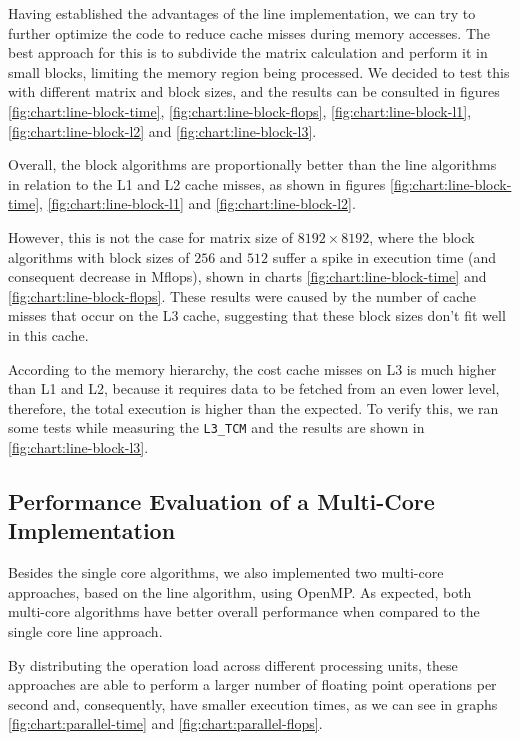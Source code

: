 Having established the advantages of the line implementation, we can try to further optimize the code to reduce cache misses during memory accesses. The best approach for this is to subdivide the matrix calculation and perform it in small blocks, limiting the memory region being processed. We decided to test this with different matrix and block sizes, and the results can be consulted in figures \ref{fig:chart:line-block-time}, \ref{fig:chart:line-block-flops}, \ref{fig:chart:line-block-l1}, \ref{fig:chart:line-block-l2} and \ref{fig:chart:line-block-l3}.

Overall, the block algorithms are proportionally better than the line algorithms in relation to the L1 and L2 cache misses, as shown in figures \ref{fig:chart:line-block-time}, \ref{fig:chart:line-block-l1} and \ref{fig:chart:line-block-l2}. 

However, this is not the case for matrix size of $8192 \times 8192$, where the block algorithms with block sizes of $256$ and $512$ suffer a spike in execution time (and consequent decrease in Mflops), shown in charts \ref{fig:chart:line-block-time} and \ref{fig:chart:line-block-flops}. These results were caused by the number of cache misses that occur on the L3 cache, suggesting that these block sizes don't fit well in this cache. 

According to the memory hierarchy, the cost cache misses on L3 is much higher than L1 and L2, because it requires data to be fetched from an even lower level, therefore, the total execution is higher than the expected. To verify this, we ran some tests while measuring the \verb#L3_TCM# and the results are shown in \ref{fig:chart:line-block-l3}. 

\subsection{Performance Evaluation of a Multi-Core Implementation}

Besides the single core algorithms, we also implemented two multi-core approaches, based on the line algorithm, using OpenMP. As expected, both multi-core algorithms have better overall performance when compared to the single core line approach.

By distributing the operation load across different processing units, these approaches are able to perform a larger number of floating point operations per second and, consequently, have smaller execution times, as we can see in graphs \ref{fig:chart:parallel-time} and \ref{fig:chart:parallel-flops}.

